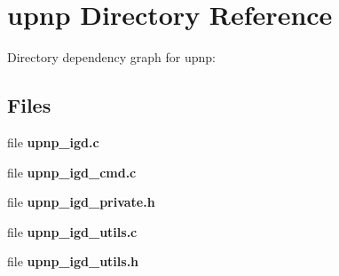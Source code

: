 \section{upnp Directory Reference}
\label{dir_5804deee73e9aea531c36e65f321ca89}
Directory dependency graph for upnp\-:
\subsection*{Files}
\begin{DoxyCompactItemize}
\item 
file {\bfseries upnp\-\_\-igd.\-c}
\item 
file {\bfseries upnp\-\_\-igd\-\_\-cmd.\-c}
\item 
file {\bfseries upnp\-\_\-igd\-\_\-private.\-h}
\item 
file {\bfseries upnp\-\_\-igd\-\_\-utils.\-c}
\item 
file {\bfseries upnp\-\_\-igd\-\_\-utils.\-h}
\end{DoxyCompactItemize}
